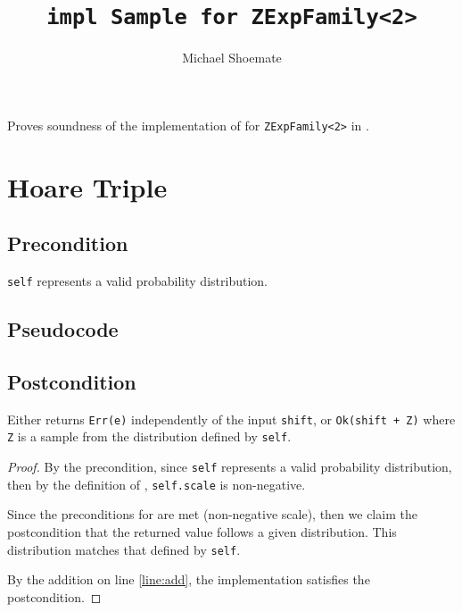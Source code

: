 \documentclass{article}
\title{\texttt{impl Sample for ZExpFamily<2>}}
\author{Michael Shoemate}
\date{}
\begin{document}
\maketitle

\contrib
Proves soundness of the implementation of  for \texttt{ZExpFamily<2>} in .

\section{Hoare Triple}
\subsection*{Precondition}
\texttt{self} represents a valid probability distribution.

\subsection*{Pseudocode}


\subsection*{Postcondition}
\begin{theorem}
    \label{postcondition}
    Either returns \texttt{Err(e)} independently of the input \texttt{shift},
    or \texttt{Ok(shift + Z)} where \texttt{Z} is a sample from the distribution defined by \texttt{self}.
\end{theorem}

\begin{proof}
    By the precondition, since \texttt{self} represents a valid probability distribution, 
    then by the definition of ,
    \texttt{self.scale} is non-negative.

    Since the preconditions for  are met (non-negative scale),
    then we claim the postcondition that the returned value follows a given distribution.
    This distribution matches that defined by \texttt{self}.

    By the addition on line \ref{line:add}, the implementation satisfies the postcondition.
\end{proof}
\end{document}
